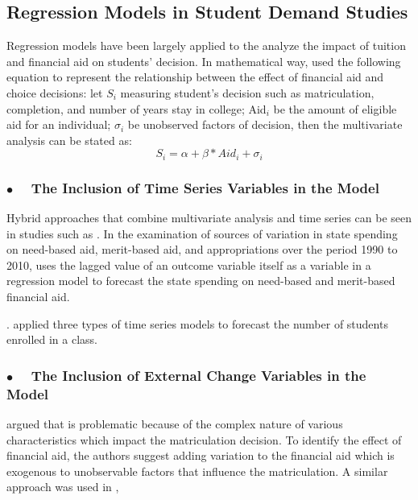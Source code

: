 \documentclass[12pt,english]{report}
\begin{document}
\subsection{Regression Models in Student Demand Studies}
 Regression models have been largely applied to the analyze the impact of tuition and financial aid on students' decision.
 In mathematical way,
\citet{Dynarski2002} used the following equation to represent the relationship between the effect of financial aid and choice decisions:
let $S_i$ measuring student's decision such as matriculation, completion, and number of years stay in college; Aid$_i$ be the amount of eligible aid for an individual; $\sigma_i$  be unobserved factors of decision, then the multivariate analysis can be stated as: $$S_i = \alpha + \beta * Aid_i + \sigma_i$$



\subsubsection{$\bullet \quad$  The Inclusion of Time Series Variables in the Model} Hybrid approaches that combine multivariate analysis and time series can be seen in studies such as \citet{Heller1999}. In the examination of sources of variation in state spending on need-based aid, merit-based aid, and appropriations over the period 1990 to 2010, \citep{McLendon2014} uses the lagged value of an outcome variable itself as a variable in a regression model to forecast the state spending on need-based and
merit-based financial aid.

. \citep{Lavilles2012} applied three types of time series models to forecast the number of students enrolled in a class.

\subsubsection{$\bullet \quad$  The Inclusion of External Change Variables in the Model} 

\citet{Dynarski2003} argued that  is problematic because of the complex nature of various characteristics which impact the matriculation decision. To identify the effect of financial aid, the authors suggest adding variation to the financial aid which is exogenous to unobservable factors that influence the matriculation.  A similar approach was used in \citep{Dynarski2003, Abraham2006},
\end{document}
